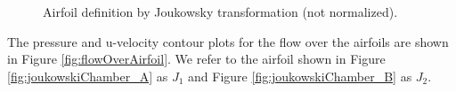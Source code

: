 \documentclass[12pt]{aiaa-pretty}
\begin{document}
%
	\begin{figure}[H]
		\centering
		\quad
		\caption{Airfoil definition by Joukowsky transformation (not normalized).}
		\label{fig:joukowskiChamber}
	\end{figure}
%

The pressure and u-velocity contour plots for the flow over the airfoils are shown in Figure \ref{fig:flowOverAirfoil}. We refer to the airfoil shown in Figure \ref{fig:joukowskiChamber_A} as $J_1$ and Figure \ref{fig:joukowskiChamber_B} as $J_2$.
\end{document}
